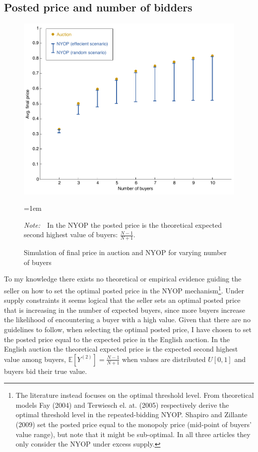 \documentclass[a4paper,12pt]{article}
\newcommand{\Figtext}[1]{%
	\begin{tablenotes}[para,flushleft]
		\hangindent=1em
		\footnotesize
		\raggedright
		#1
	\end{tablenotes}
}
\newcommand{\Fignote}[1]{\Figtext{\emph{Note:~}~#1}}
\begin{document}
	\subsection{Posted price and number of bidders}

	\begin{figure}
	        \centering
	        \caption{Simulation of final price in auction and NYOP for varying number of buyers}
	        \includegraphics[width=\textwidth]{Figures/FinalPrice_Auction-NYOP}
			\label{fig:FinalPrice_Auction-NYOP}
			\Fignote{In the NYOP the posted price is the theoretical expected second highest value of buyers: $\frac{N-1}{N+1}$.}
	\end{figure}
	
	 To my knowledge there exists no theoretical or empirical evidence guiding the seller on how to set the optimal posted price in the NYOP mechanism\footnote{The literature instead focuses on the optimal threshold level. From theoretical models Fay (2004) and Terwiesch el. at. (2005) respectively derive the optimal threshold level in the repeated-bidding NYOP. Shapiro and Zillante (2009) set the posted price equal to the monopoly price (mid-point of buyers' value range), but note that it might be sub-optimal. In all three articles they only consider the NYOP under excess supply.}. Under supply constraints it seems logical that the seller sets an optimal posted price that is increasing in the number of expected buyers, since more buyers increase the likelihood of encountering a buyer with a high value. Given that there are no guidelines to follow, when selecting the optimal posted price, I have chosen to set the posted price equal to the expected price in the English auction. In the English auction the theoretical expected price is the expected second highest value among buyers, $\mathbb{E}[Y^{(2)}] = \frac{N-1}{N+1}$ when values are distributed $U[0,1]$ and buyers bid their true value.
\end{document}
